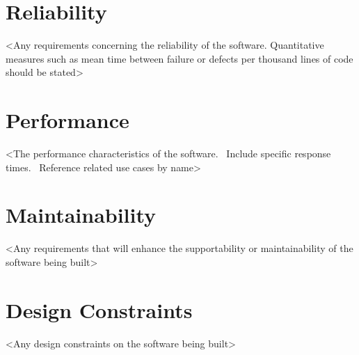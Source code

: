 \documentclass[letterpaper]{report}
\begin{document}
\section{Reliability}
 {\textless}Any requirements concerning the reliability of the software. Quantitative measures such as mean time between failure or defects per thousand lines of code should be stated{\textgreater}

\section{Performance}
 {\textless}The performance characteristics of the software. \ Include specific response times. \ Reference related use cases by name{\textgreater}

\section{Maintainability}
 {\textless}Any requirements that will enhance the supportability or maintainability of the software being built{\textgreater}

\section{Design Constraints}
 {\textless}Any design constraints on the software being built{\textgreater}
\end{document}

